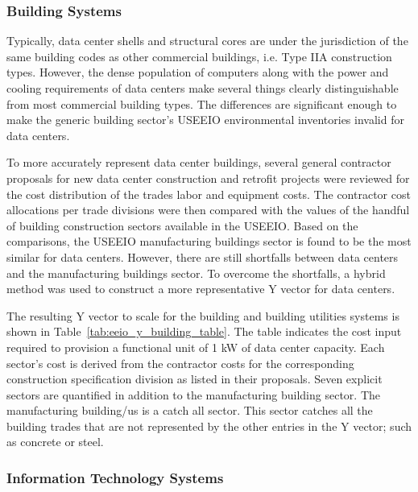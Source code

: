         \subsubsection{Building Systems}
        Typically, data center shells and structural cores are under the jurisdiction of the same building codes as other commercial buildings, i.e. Type IIA construction types. However, the dense population of computers along with the  power and cooling requirements of data centers make several things clearly distinguishable from most commercial building types. The differences are significant enough to make the generic building sector's USEEIO environmental inventories invalid for data centers. 
        
        To more accurately represent data center buildings, several general contractor proposals for new data center construction and retrofit projects were reviewed for the cost distribution of the trades labor and equipment costs.  The contractor cost allocations per trade divisions were then compared with the values of the handful of building construction sectors available in the USEEIO. Based on the comparisons, the USEEIO manufacturing buildings sector is found to be the most similar for data centers. However, there are still shortfalls between data centers and the manufacturing buildings sector. To overcome the shortfalls, a hybrid method was used to construct a more representative Y vector for data centers. 
        
        The resulting Y vector to scale for the building and building utilities systems is shown in Table~\ref{tab:eeio_y_building_table}. The table indicates the cost input required to provision a functional unit of 1 kW of data center capacity. Each sector's cost is derived from the contractor costs for the corresponding construction specification division as listed  in their proposals. Seven explicit sectors are quantified in addition to the manufacturing building sector. The manufacturing building/us is a catch all sector. This sector catches all the building trades that are not represented by the other entries in the Y vector; such as concrete or steel. 
        
        
        
        \subsubsection{Information Technology Systems}
        

